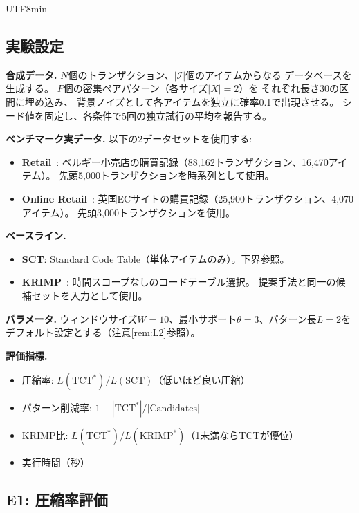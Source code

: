 \documentclass[11pt,a4paper]{article}
\begin{document}
\begin{CJK}{UTF8}{min}
\subsection{実験設定}

\textbf{合成データ.}
$N$個のトランザクション、$|\mathcal{I}|$個のアイテムからなる
データベースを生成する。
$P$個の密集ペアパターン（各サイズ$|X|{=}2$）を
それぞれ長さ30の区間に埋め込み、
背景ノイズとして各アイテムを独立に確率0.1で出現させる。
シード値を固定し、各条件で5回の独立試行の平均を報告する。

\textbf{ベンチマーク実データ.}
以下の2データセットを使用する:
\begin{itemize}
  \item \textbf{Retail}~\cite{brijs2003retail}: ベルギー小売店の購買記録（88,162トランザクション、16,470アイテム）。
    先頭5,000トランザクションを時系列として使用。
  \item \textbf{Online Retail}~\cite{chen2012online}: 英国ECサイトの購買記録（25,900トランザクション、4,070アイテム）。
    先頭3,000トランザクションを使用。
\end{itemize}

\textbf{ベースライン.}
\begin{itemize}
  \item \textbf{SCT}: Standard Code Table（単体アイテムのみ）。下界参照。
  \item \textbf{KRIMP}~\cite{vreeken2011krimp}: 時間スコープなしのコードテーブル選択。
    提案手法と同一の候補セットを入力として使用。
\end{itemize}

\textbf{パラメータ.}
ウィンドウサイズ$W{=}10$、最小サポート$\theta{=}3$、パターン長$L{=}2$を
デフォルト設定とする（注意\ref{rem:L2}参照）。

\textbf{評価指標.}
\begin{itemize}
  \item 圧縮率: $L(\text{TCT}^*)/L(\text{SCT})$（低いほど良い圧縮）
  \item パターン削減率: $1 - |\text{TCT}^*|/|\text{Candidates}|$
  \item KRIMP比: $L(\text{TCT}^*)/L(\text{KRIMP}^*)$（1未満ならTCTが優位）
  \item 実行時間（秒）
\end{itemize}

\subsection{E1: 圧縮率評価}


\end{CJK}
\end{document}
